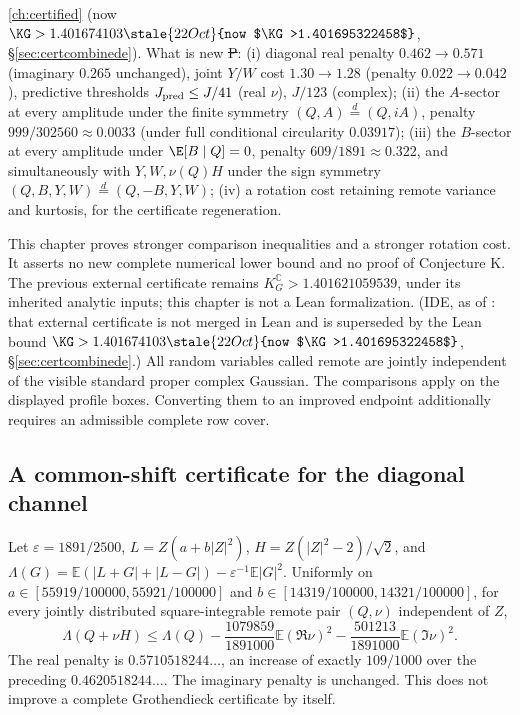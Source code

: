 \autoref{ch:certified} (now $\KG>1.401674103\stale{22 Oct}{now $\KG>1.401695322458$}$, \S\ref{sec:certcombinede}). What is new \st{P}: (i) diagonal real penalty $0.462\to0.571$ (imaginary $0.265$ unchanged), joint $Y/W$ cost $1.30\to1.28$ (penalty $0.022\to0.042$), predictive
thresholds $J_{\rm pred}\le J/41$ (real $\nu$), $J/123$ (complex); (ii) the $A$-sector at every amplitude under the finite symmetry $(Q,A)\overset{d}=(Q,iA)$, penalty $999/302560\approx0.0033$
(under full conditional circularity $0.03917$); (iii) the $B$-sector at every amplitude under $\E[B\mid Q]=0$, penalty $609/1891\approx0.322$, and simultaneously with $Y,W,\nu(Q)H$ under the sign
symmetry $(Q,B,Y,W)\overset{d}=(Q,-B,Y,W)$; (iv) a rotation cost retaining remote variance and kurtosis, for the certificate regeneration.

This chapter proves stronger comparison inequalities and a stronger rotation
cost. It asserts no new complete numerical lower bound and no proof of
Conjecture K. The previous external certificate remains
$K_G^{\mathbb C}>1.401621059539$, under its inherited analytic inputs;
this chapter is not a Lean formalization. (IDE, as of : that external certificate
is not merged in Lean and is superseded by the Lean bound $\KG>1.401674103\stale{22 Oct}{now $\KG>1.401695322458$}$,
\S\ref{sec:certcombinede}.) All random variables called remote
are jointly independent of the visible standard proper complex Gaussian.
The comparisons apply on the displayed profile boxes. Converting them to
an improved endpoint additionally requires an admissible complete row cover.
\subsection{A common-shift certificate for the diagonal channel}
\label{sec:diagonal-common-shift}
Let $\varepsilon=1891/2500$, $L=Z(a+b|Z|^2)$,
$H=Z(|Z|^2-2)/\sqrt2$, and
$\Lambda(G)=\mathbb E(|L+G|+|L-G|)-\varepsilon^{-1}\mathbb E|G|^2$.
Uniformly on
$a\in[55919/100000,55921/100000]$ and
$b\in[14319/100000,14321/100000]$, for every jointly distributed
square-integrable remote pair $(Q,\nu)$ independent of $Z$,
\begin{equation}\label{eq:common-shift-diagonal}
 \boxed{\Lambda(Q+\nu H)\le\Lambda(Q)
 -\frac{1079859}{1891000}\mathbb E(\Re\nu)^2
 -\frac{501213}{1891000}\mathbb E(\Im\nu)^2.}
\end{equation}
The real penalty is $0.5710518244\ldots$, an increase of exactly
$109/1000$ over the preceding $0.4620518244\ldots$.
The imaginary penalty is unchanged. This does not improve a complete
Grothendieck certificate by itself.

